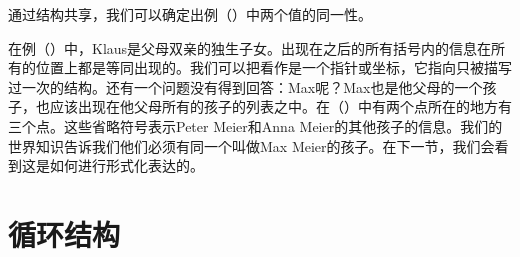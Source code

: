 通过结构共享，我们可以确定出例（）中两个值的同一性。
\begin{figure}
\ea
{}
\z
\vspace{-\baselineskip}
\end{figure}%
在例（）中，Klaus是父母双亲的独生子女。出现在之后的所有括号内的信息在所有的位置上都是等同出现的。我们可以把看作是一个指针或坐标，它指向只被描写过一次的结构。还有一个问题没有得到回答：Max呢？Max也是他父母的一个孩子，也应该出现在他父母所有的孩子的列表之中。在（）中有两个点所在的地方有三个点。这些省略符号表示Peter Meier和Anna Meier的其他孩子的信息。我们的世界知识告诉我们他们必须有同一个叫做Max Meier的孩子。在下一节，我们会看到这是如何进行形式化表达的。

\section{循环结构}
\label{sec-cyclic-fd}


